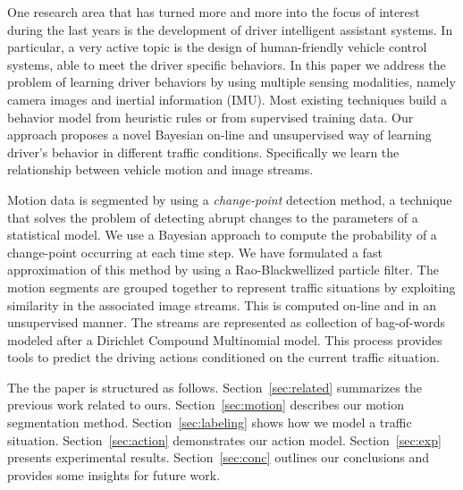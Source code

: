 One research area that has turned more and more into the focus of interest
during the last years is the development of driver intelligent assistant
systems. In particular, a very active topic is the design of human-friendly
vehicle control systems, able to meet the driver specific behaviors. In this
paper we address the problem of learning driver behaviors by using multiple
sensing modalities, namely camera images and inertial information (IMU). Most
existing techniques build a behavior model from heuristic rules or from
supervised training data. Our approach proposes a novel Bayesian on-line and
unsupervised way of learning driver's behavior in different traffic conditions.
Specifically we learn the relationship between vehicle motion and image streams.

Motion data is segmented by using a \textit{change-point} detection method, a
technique that solves the problem of detecting abrupt changes to the parameters
of a statistical model. We use a Bayesian approach to compute the probability of
a change-point occurring at each time step. We have formulated a fast
approximation of this method by using a Rao-Blackwellized particle filter.
The motion segments are grouped together to represent traffic situations by
exploiting similarity in the associated image streams. This is computed on-line
and in an unsupervised manner. The streams are represented as collection of
bag-of-words modeled after a Dirichlet Compound Multinomial model. This process
provides tools to predict the driving actions conditioned on the current traffic
situation.

The the paper is structured as follows. Section~\ref{sec:related}
summarizes the previous work related to ours. Section~\ref{sec:motion}
describes our motion segmentation method. Section~\ref{sec:labeling}
shows how we model a traffic situation. Section~\ref{sec:action} demonstrates
our action model. Section~\ref{sec:exp} presents experimental results.
Section~\ref{sec:conc} outlines our conclusions and provides some insights for
future work.
